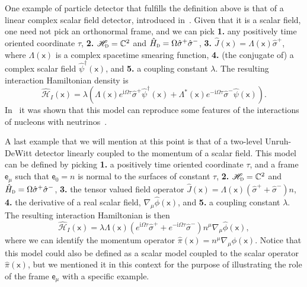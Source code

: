 \documentclass[letterpaper,12pt,titlepage,oneside,final]{book}
\newcommand{\mf}{\mathsf}%
\newcommand{\ii}{\mathrm{i}}
\newcommand{\tc}[1]{\textsc{#1}}
\begin{document}
One example of particle detector that fulfills the definition above is that of a linear complex scalar field detector, introduced in~\cite{antiparticles}. Given that it is a scalar field, one need not pick an orthonormal frame, and we can pick \textbf{1.} any positively time oriented coordinate $\tau$, \textbf{2.} $\mathscr{H}_\tc{d} = \mathbb{C}^2$ and $\hat{H}_{\tc{d}} = \Omega\hat{\sigma}^+\hat{\sigma}^-$, \textbf{3.} $\hat{J}(\mf x) = \Lambda(\mf x) \hat{\sigma}^+$, where $\Lambda(\mf x)$ is a complex spacetime smearing function, \textbf{4.} (the conjugate of) a complex scalar field $\hat{\psi}^\dagger(\mf x)$, and \textbf{5.} a coupling constant $\lambda$. The resulting interaction Hamiltonian density is
\begin{equation}
    \hat{\mathcal{H}}_I(\mf x) = \lambda (\Lambda(\mf x) e^{\ii\Omega \tau}\hat{\sigma}^+ \hat{\psi}^\dagger(\mf x) + \Lambda^*(\mf x) e^{-\ii\Omega \tau}\hat{\sigma}^- \hat{\psi}(\mf x)). 
\end{equation}
In~\cite{antiparticles} it was shown that this model can reproduce some features of the interactions of nucleons with neutrinos~\cite{neutrinos}. 

A last example that we will mention at this point is that of a two-level Unruh-DeWitt detector linearly coupled to the momentum of a scalar field. This model can be defined by picking \textbf{1.} a positively time oriented coordinate $\tau$, and a frame $\mf e_\mu$ such that $\mf e_0 = n$ is normal to the surfaces of constant $\tau$, \textbf{2.} $\mathscr{H}_\tc{d} = \mathbb{C}^2$ and $\hat{H}_{\tc{d}} = \Omega\hat{\sigma}^+\hat{\sigma}^-$, \textbf{3.} the tensor valued field operator $\hat{J}(\mf x) = \Lambda(\mf x) (\hat{\sigma}^+ + \hat{\sigma}^-)n$, \textbf{4.} the derivative of a real scalar field, $\nabla_{\mu}\hat{\phi}(\mf x)$, and \textbf{5.} a coupling constant $\lambda$. The resulting interaction Hamiltonian is then
\begin{equation}
    \hat{\mathcal{H}}_I(\mf x) =\lambda \Lambda(\mf x) (e^{\ii \Omega \tau} \hat{\sigma}^+ + e^{-\ii \Omega \tau} \hat{\sigma}^-)n^\mu \nabla_\mu\hat{\phi}(\mf x),
\end{equation}
where we can identify the momentum operator $\hat{\pi}(\mf x) = n^\mu\nabla_\mu\hat{\phi}(\mf x)$. Notice that this model could also be defined as a scalar model coupled to the scalar operator $\hat{\pi}(\mf x)$, but we mentioned it in this context for the purpose of illustrating the role of the frame $\mf e_\mu$ with a specific example.
\end{document}
